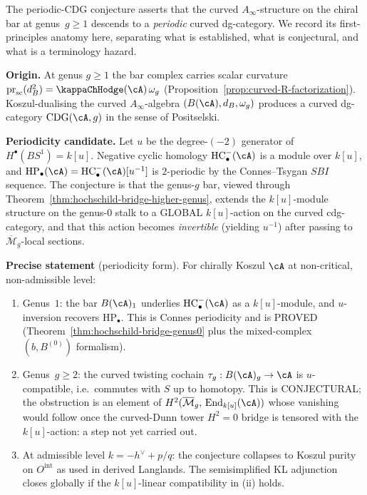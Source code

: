 \begin{remark}
\label{rem:periodic-cdg-mechanism}
The periodic-CDG conjecture asserts that the curved
$A_\infty$-structure on the chiral bar at genus~$g \geq 1$
descends to a \emph{periodic} curved dg-category. We record its
first-principles anatomy here, separating what is established,
what is conjectural, and what is a terminology hazard.

\medskip
\noindent\textbf{Origin.} At genus $g \geq 1$ the bar complex
carries scalar curvature
$\operatorname{pr}_{\mathrm{sc}}(d_B^2) = \kappaChHodge(\cA)\,\omega_g$
(Proposition~\ref{prop:curved-R-factorization}). Koszul-dualising
the curved $A_\infty$-algebra $(B(\cA), d_B, \omega_g)$ produces a
curved dg-category $\mathrm{CDG}(\cA, g)$ in the sense of
Positselski.

\medskip
\noindent\textbf{Periodicity candidate.} Let $u$ be the
degree-$(-2)$ generator of $H^\bullet(BS^1) = k[u]$. Negative
cyclic homology $\mathrm{HC}^-_\bullet(\cA)$ is a module over
$k[u]$, and
$\mathrm{HP}_\bullet(\cA) =
\mathrm{HC}^-_\bullet(\cA)[u^{-1}]$ is $2$-periodic by the
Connes--Tsygan $SBI$ sequence. The conjecture is that the
genus-$g$ bar, viewed through
Theorem~\ref{thm:hochschild-bridge-higher-genus}, extends the
$k[u]$-module structure on the genus-$0$ stalk to a GLOBAL
$k[u]$-action on the curved cdg-category, and that this action
becomes \emph{invertible} (yielding $u^{-1}$) after passing to
$\overline{\mathcal{M}}_g$-local sections.

\medskip
\noindent\textbf{Precise statement} (periodicity form). For
chirally Koszul $\cA$ at non-critical, non-admissible level:
\begin{enumerate}[label=\textup{(\roman*)}]
\item Genus~$1$: the bar $B(\cA)_1$ underlies
$\mathrm{HC}^-_\bullet(\cA)$ as a $k[u]$-module, and
$u$-inversion recovers $\mathrm{HP}_\bullet$. This is
Connes periodicity and is PROVED
(Theorem~\ref{thm:hochschild-bridge-genus0} plus the
mixed-complex $(b, B^{(0)})$ formalism).
\item Genus~$g \geq 2$: the curved twisting cochain
$\tau_g : B(\cA)_g \to \cA$ is $u$-compatible,
i.e.\ commutes with $S$ up to homotopy. This is CONJECTURAL;
the obstruction is an element of
$H^2(\overline{\mathcal{M}}_g,\, \mathrm{End}_{k[u]}(\cA))$
whose vanishing would follow once the curved-Dunn tower
$H^2 = 0$ bridge is tensored with the $k[u]$-action: a step
not yet carried out.
\item At admissible level $k = -h^\vee + p/q$: the conjecture
collapses to Koszul purity on \(O^{\mathrm{int}}\) as used in
derived Langlands. The semisimplified KL adjunction closes globally if
the \(k[u]\)-linear compatibility in (ii) holds.
\end{enumerate}


\end{remark}
